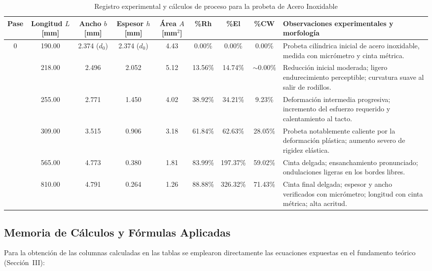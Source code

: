 \documentclass[journal]{IEEEtran}
\begin{document}
\begin{table}[t]
\centering
\caption{Registro experimental y cálculos de proceso para la probeta de Acero Inoxidable}
\label{tab:datos_acero_inox}
\footnotesize
\setlength{\tabcolsep}{3.5pt}
\renewcommand{\arraystretch}{1.15}
\begin{tabularx}{\textwidth}{c c c c c c c c >{\raggedright\arraybackslash}X}
\toprule
\textbf{Pase} & \makecell{\textbf{Longitud}\\\textbf{$L$ [mm]}} & \makecell{\textbf{Ancho}\\\textbf{$b$ [mm]}} & \makecell{\textbf{Espesor}\\\textbf{$h$ [mm]}} & \makecell{\textbf{Área}\\\textbf{$A$ [mm$^2$]}} & \textbf{\%Rh} & \textbf{\%El} & \textbf{\%CW} & \textbf{Observaciones experimentales y morfología} \\
\midrule
0 & 190.00 & 2.374 ($d_0$) & 2.374 ($d_0$) & 4.43 & 0.00\% & 0.00\% & 0.00\% & Probeta cilíndrica inicial de acero inoxidable, medida con micrómetro y cinta métrica. \\ \addlinespace[3.5pt]
1 & 218.00 & 2.496 & 2.052 & 5.12 & 13.56\% & 14.74\% & $\sim 0.00\%$ & Reducción inicial moderada; ligero endurecimiento perceptible; curvatura suave al salir de rodillos. \\ \addlinespace[3.5pt]
2 & 255.00 & 2.771 & 1.450 & 4.02 & 38.92\% & 34.21\% & 9.23\% & Deformación intermedia progresiva; incremento del esfuerzo requerido y calentamiento al tacto. \\ \addlinespace[3.5pt]
3 & 309.00 & 3.515 & 0.906 & 3.18 & 61.84\% & 62.63\% & 28.05\% & Probeta notablemente caliente por la deformación plástica; aumento severo de rigidez elástica. \\ \addlinespace[3.5pt]
4 & 565.00 & 4.773 & 0.380 & 1.81 & 83.99\% & 197.37\% & 59.02\% & Cinta delgada; ensanchamiento pronunciado; ondulaciones ligeras en los bordes libres. \\ \addlinespace[3.5pt]
5 & 810.00 & 4.791 & 0.264 & 1.26 & 88.88\% & 326.32\% & 71.43\% & Cinta final delgada; espesor y ancho verificados con micrómetro; longitud con cinta métrica; alta acritud. \\
\bottomrule
\end{tabularx}
\end{table}

\subsection{Memoria de Cálculos y Fórmulas Aplicadas}
Para la obtención de las columnas calculadas en las tablas se emplearon directamente las ecuaciones expuestas en el fundamento teórico (Sección~III):
\end{document}
